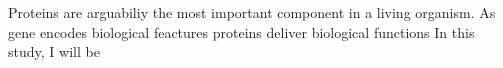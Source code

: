 Proteins are arguabiliy the most important component in a living organism. As gene encodes biological feactures  proteins deliver biological functions   In this study, I will be 